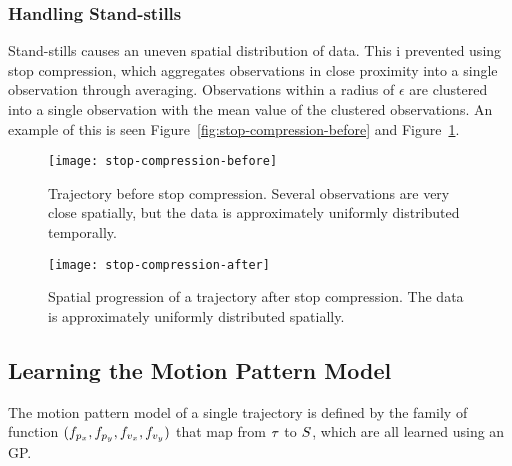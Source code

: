 \subsubsection{Handling Stand-stills}\label{sec:stop-compression}
Stand-stills causes an uneven spatial distribution of data. This i
prevented using stop compression, which aggregates observations in close proximity into a
single observation through averaging. Observations within a radius of
$\epsilon$ are clustered into a single observation with the mean value of
the clustered observations. An example of this is seen
Figure~\ref{fig:stop-compression-before} and Figure~\ref{fig:stop-compression-after}.
\begin{figure}
  \begin{minipage}{.46\textwidth}
    \texttt{[image: stop-compression-before]}
    \caption{Trajectory before stop compression. Several observations
      are very close spatially, but the data is
      approximately uniformly distributed temporally. }\label{fig:stop-compression-before}
  \end{minipage}
  \hspace{5pt}
  \begin{minipage}{.46\textwidth}
    \texttt{[image: stop-compression-after]}
    \caption{Spatial progression of a trajectory
      after stop compression. The data is
      approximately uniformly distributed spatially.}\label{fig:stop-compression-after}
  \end{minipage}
\end{figure}

\subsection{Learning the Motion Pattern Model}
The motion pattern model of a single trajectory is defined by the family of
function $(f_{p_x}, f_{p_y}, f_{v_x}, f_{v_y})$
that map from $\tau$ to $S$, which are all learned using an GP.



